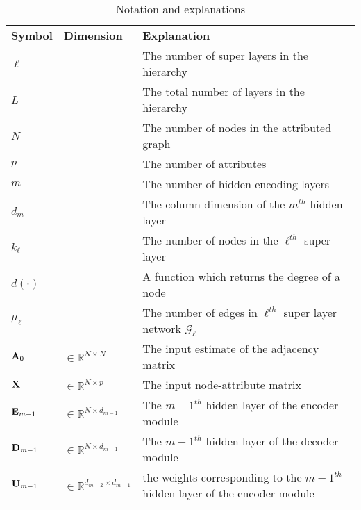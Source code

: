 \documentclass[a4paper,12pt]{article}
\begin{document}
\newpage
\appendix
\begin{table}[!ht]
	\centering
	\caption{Notation and explanations}
	\begin{tabular}{p{2cm}|p{3cm}|p{10cm}}
		\toprule[0.08cm]
		\bf Symbol & \centering \bf Dimension & \bf Explanation \\
		\cmidrule(lr){1-3}
		$\ell$ & & The number of super layers in the hierarchy \\
		
		$L$ & & The total number of layers in the hierarchy \\
		
		$N$ & & The number of nodes in the attributed graph \\
		
		$p$ & & The number of attributes \\
		
		$m$ & & The number of hidden encoding layers \\
		
		$d_m$ & & The column dimension of the $m^{th}$ hidden layer \\
		
		$k_\ell$ & & The number of nodes in the $\ell^{th}$ super layer \\
		
		$d(\cdot)$ & & A function which returns the degree of a node \\
		
		$\mu_\ell$ & & The number of edges in $\ell^{th}$ super layer network $\mathcal{G}_{\ell}$ \\
		
		${\bf A}_0$ & $ \in \mathbb{R}^{N \times N}$ & The input estimate of the adjacency matrix \\
		
		${\bf X}$ &$\in \mathbb{R}^{N \times p}$ & The input node-attribute matrix \\
		
		${\bf E}_{m-1}$ & $\in \mathbb{R}^{N \times d_{m-1}}$ & The ${m-1}^{th}$ hidden layer of the encoder module\\
		
		${\bf D}_{m-1}$ & $\in \mathbb{R}^{N \times d_{m-1}}$ & The ${m-1}^{th}$ hidden layer of the decoder module\\
		
		${\bf U}_{m-1}$ & $\in \mathbb{R}^{d_{m-2}\times d_{m-1}}$ & the weights corresponding to the ${m-1}^{th}$ hidden layer of the encoder module \\
		

\end{tabular}
\end{table}
\end{document}
